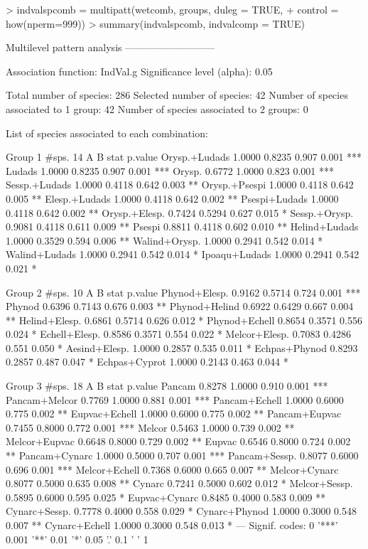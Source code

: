 \documentclass[11pt,a4paper]{article}
\begin{document}
\begin{Schunk}
\begin{Sinput}
> indvalspcomb = multipatt(wetcomb, groups, duleg = TRUE, 
+                        control = how(nperm=999))
> summary(indvalspcomb, indvalcomp = TRUE)
\end{Sinput}
\begin{Soutput}
 Multilevel pattern analysis
 ---------------------------

 Association function: IndVal.g
 Significance level (alpha): 0.05

 Total number of species: 286
 Selected number of species: 42 
 Number of species associated to 1 group: 42 
 Number of species associated to 2 groups: 0 

 List of species associated to each combination: 

 Group 1  #sps.  14 
                   A      B  stat p.value    
Orysp.+Ludads 1.0000 0.8235 0.907   0.001 ***
Ludads        1.0000 0.8235 0.907   0.001 ***
Orysp.        0.6772 1.0000 0.823   0.001 ***
Sessp.+Ludads 1.0000 0.4118 0.642   0.003 ** 
Orysp.+Psespi 1.0000 0.4118 0.642   0.005 ** 
Elesp.+Ludads 1.0000 0.4118 0.642   0.002 ** 
Psespi+Ludads 1.0000 0.4118 0.642   0.002 ** 
Orysp.+Elesp. 0.7424 0.5294 0.627   0.015 *  
Sessp.+Orysp. 0.9081 0.4118 0.611   0.009 ** 
Psespi        0.8811 0.4118 0.602   0.010 ** 
Helind+Ludads 1.0000 0.3529 0.594   0.006 ** 
Walind+Orysp. 1.0000 0.2941 0.542   0.014 *  
Walind+Ludads 1.0000 0.2941 0.542   0.014 *  
Ipoaqu+Ludads 1.0000 0.2941 0.542   0.021 *  

 Group 2  #sps.  10 
                   A      B  stat p.value    
Phynod+Elesp. 0.9162 0.5714 0.724   0.001 ***
Phynod        0.6396 0.7143 0.676   0.003 ** 
Phynod+Helind 0.6922 0.6429 0.667   0.004 ** 
Helind+Elesp. 0.6861 0.5714 0.626   0.012 *  
Phynod+Echell 0.8654 0.3571 0.556   0.024 *  
Echell+Elesp. 0.8586 0.3571 0.554   0.022 *  
Melcor+Elesp. 0.7083 0.4286 0.551   0.050 *  
Aesind+Elesp. 1.0000 0.2857 0.535   0.011 *  
Echpas+Phynod 0.8293 0.2857 0.487   0.047 *  
Echpas+Cyprot 1.0000 0.2143 0.463   0.044 *  

 Group 3  #sps.  18 
                   A      B  stat p.value    
Pancam        0.8278 1.0000 0.910   0.001 ***
Pancam+Melcor 0.7769 1.0000 0.881   0.001 ***
Pancam+Echell 1.0000 0.6000 0.775   0.002 ** 
Eupvac+Echell 1.0000 0.6000 0.775   0.002 ** 
Pancam+Eupvac 0.7455 0.8000 0.772   0.001 ***
Melcor        0.5463 1.0000 0.739   0.002 ** 
Melcor+Eupvac 0.6648 0.8000 0.729   0.002 ** 
Eupvac        0.6546 0.8000 0.724   0.002 ** 
Pancam+Cynarc 1.0000 0.5000 0.707   0.001 ***
Pancam+Sessp. 0.8077 0.6000 0.696   0.001 ***
Melcor+Echell 0.7368 0.6000 0.665   0.007 ** 
Melcor+Cynarc 0.8077 0.5000 0.635   0.008 ** 
Cynarc        0.7241 0.5000 0.602   0.012 *  
Melcor+Sessp. 0.5895 0.6000 0.595   0.025 *  
Eupvac+Cynarc 0.8485 0.4000 0.583   0.009 ** 
Cynarc+Sessp. 0.7778 0.4000 0.558   0.029 *  
Cynarc+Phynod 1.0000 0.3000 0.548   0.007 ** 
Cynarc+Echell 1.0000 0.3000 0.548   0.013 *  
---
Signif. codes:  0 '***' 0.001 '**' 0.01 '*' 0.05 '.' 0.1 ' ' 1 
\end{Soutput}
\end{Schunk}
\end{document}
